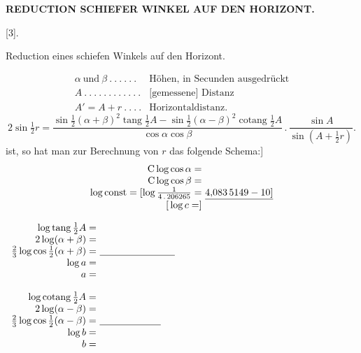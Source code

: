 \par\clearpage
\noindent\null\hfill{\small\textbf{REDUCTION SCHIEFER WINKEL AUF DEN HORIZONT.}}\hfill{}\par\bigskip
\begin{center}[3].\par\medskip
{\large Reduction eines schiefen Winkels auf den Horizont.}\end{center}
\noindent [Es seien]
\[
\begin{array}{ll}
\alpha\ \text{und}\ \beta\ .\ .\ .\ .\ .\ .&\text{Höhen, in Secunden ausgedrückt}\\
A\ .\ .\ .\ .\ .\ .\ .\ .\ .\ .\ .\ .&\text{[gemessene] Distanz}\\
A'=A+r\ .\ .\ .\ .&\text{Horizontaldistanz.}
\end{array}
\]
\[
2\sin\tfrac12r=\frac{\sin\frac12(\alpha+\beta)^2\operatorname{tang}\frac12A-\sin\frac12(\alpha-\beta)^2\operatorname{cotang}\frac12A}{\cos\alpha\cos\beta}\,.\,\frac{\sin A}{\sin(A+\frac12r)}.
\]
\noindent [Da angenähert
\[
\sin\tfrac12u=\frac{u''}{2\,.\,206265}\sqrt[3]{\cos\tfrac12u}
\]
\noindent ist, so hat man zur Berechnung von $r$ das folgende Schema:]
\[
\begin{array}{r@{\ }l}
\mathrm C\log\cos\alpha=&\\
\mathrm C\log\cos\beta=&\\
\log\mathrm{const}=[\log\frac1{4\,.\,206265}=&\underline{4{,}083\,5149-10]}\\
{[}\log c=]&
\end{array}
\]
\noindent\begin{minipage}[t]{.49\linewidth}\centering
$\begin{array}{r@{\ }l}
\log\operatorname{tang}\tfrac12A=&\\
2\log(\alpha+\beta)=&\\
\tfrac23\log\cos\tfrac12(\alpha+\beta)=&\underline{\hspace{2.7cm}}\\
\log a=&\\
a=&
\end{array}$
\end{minipage}\hfill
\begin{minipage}[t]{.49\linewidth}\centering
$\begin{array}{r@{\ }l}
\log\operatorname{cotang}\tfrac12A=&\\
2\log(\alpha-\beta)=&\\
\tfrac23\log\cos\tfrac12(\alpha-\beta)=&\underline{\hspace{2.2cm}}\\
\log b=&\\
b=&
\end{array}$
\end{minipage}
